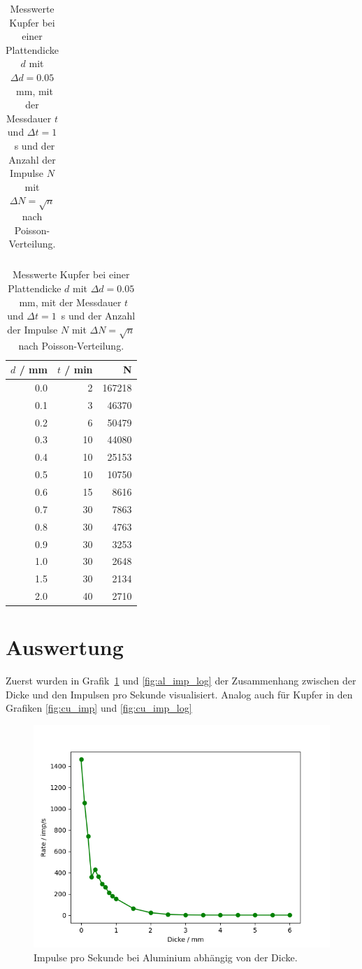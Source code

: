 \documentclass{article}
\begin{document}
\begin{multicols}{2}
\columnbreak


\begin{table}[H]
\caption{Messwerte Kupfer bei einer Plattendicke $d$ mit $\Delta d = 0.05$~mm, mit der Messdauer $t$ und $\Delta t=1$~s und der Anzahl der Impulse $N$ mit $\Delta N = \sqrt{n}$ nach Poisson-Verteilung.}

\begin{tabular}{cc}
\end{tabular}
\begin{tabular}{rrr}
$d$ / mm & $t$ / min & N \\
\hline
0.0 & 2 & 167218\\
0.1 & 3 & 46370\\
0.2 & 6 & 50479\\
0.3 & 10 & 44080\\
0.4 & 10 & 25153\\
0.5 & 10 & 10750\\
0.6 & 15 & 8616\\
0.7 & 30 & 7863\\
0.8 & 30 & 4763\\
0.9 & 30 & 3253\\
1.0 & 30 & 2648\\
1.5 & 30 & 2134\\
2.0 & 40 & 2710
\end{tabular}
\end{table}

\end{multicols}

\newpage


\section{Auswertung}


Zuerst wurden in Grafik~\ref{fig:al_imp} und \ref{fig:al_imp_log} der Zusammenhang zwischen der Dicke und den Impulsen pro Sekunde visualisiert. Analog auch für Kupfer in den Grafiken \ref{fig:cu_imp} und \ref{fig:cu_imp_log}


\begin{figure}[H]
\centering
\includegraphics[scale=0.6]{Al_imp.png}
\caption{Impulse pro Sekunde bei Aluminium abhängig von der Dicke.}
\label{fig:al_imp}
\end{figure}
\end{document}

